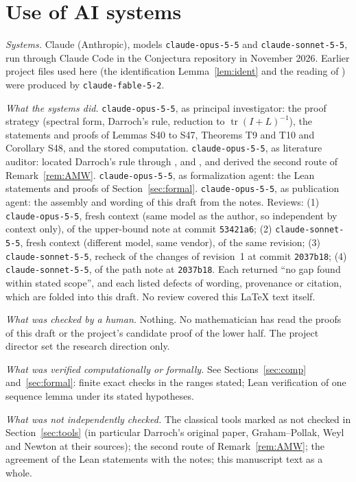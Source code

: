 \documentclass[11pt]{amsart}
\theoremstyle{definition}
\theoremstyle{remark}
\newcommand{\tr}{\operatorname{tr}}
\begin{document}
\section*{Use of AI systems}

\emph{Systems.} Claude (Anthropic), models \nolinkurl{claude-opus-5-5} and
\nolinkurl{claude-sonnet-5-5}, run through Claude Code in the Conjectura
repository in November 2026. Earlier project files used here
(the identification Lemma~\ref{lem:ident} and the reading of \cite{Col89})
were produced by \nolinkurl{claude-fable-5-2}.

\emph{What the systems did.} \nolinkurl{claude-opus-5-5}, as principal
investigator: the proof strategy (spectral form, Darroch's rule, reduction
to $\tr(I+L)^{-1}$), the statements and proofs of Lemmas S40 to S47,
Theorems T9 and T10 and Corollary S48, and the stored computation.
\nolinkurl{claude-opus-5-5}, as literature auditor: located Darroch's rule
through \cite{Pit97}, \cite{Mer90} and \cite{AMW}, and derived the second
route of Remark~\ref{rem:AMW}. \nolinkurl{claude-opus-5-5}, as formalization
agent: the Lean statements and proofs of Section~\ref{sec:formal}.
\nolinkurl{claude-opus-5-5}, as publication agent: the assembly and wording of
this draft from the notes. Reviews: (1) \nolinkurl{claude-opus-5-5}, fresh
context (same model as the author, so independent by context only), of the
upper-bound note at commit \texttt{53421a6}; (2) \nolinkurl{claude-sonnet-5-5},
fresh context (different model, same vendor), of the same revision; (3)
\nolinkurl{claude-sonnet-5-5}, recheck of the changes of revision~1 at commit
\texttt{2037b18}; (4) \nolinkurl{claude-sonnet-5-5}, of the path note at
\texttt{2037b18}. Each returned ``no gap found within stated scope'', and
each listed defects of wording, provenance or citation, which are folded
into this draft. No review covered this \LaTeX{} text itself.

\emph{What was checked by a human.} Nothing. No mathematician has read the
proofs of this draft or the project's candidate proof of the lower half. The
project director set the research direction only.

\emph{What was verified computationally or formally.} See
Sections~\ref{sec:comp} and~\ref{sec:formal}: finite exact checks in the
ranges stated; Lean verification of one sequence lemma under its stated
hypotheses.

\emph{What was not independently checked.} The classical tools marked as
not checked in Section~\ref{sec:tools} (in particular Darroch's original
paper, Graham--Pollak, Weyl and Newton at their sources); the second route
of Remark~\ref{rem:AMW}; the agreement of the Lean statements with the
notes; this manuscript text as a whole.
\end{document}
